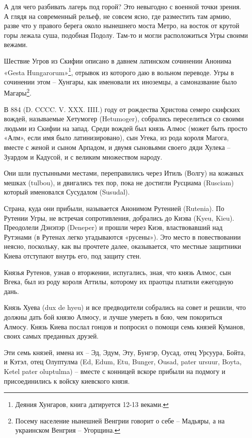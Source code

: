 А для чего разбивать лагерь под горой? Это невыгодно с военной точки зрения. А глядя на современный рельеф, не совсем ясно, где разместить там армию, разве что у правого берега около нынешнего моста Метро, на восток от крутой горы лежала суша, подобная Подолу. Там-то и могли расположиться Угры своими вежами.

Шествие Угров из Скифии описано в давнем латинском сочинении Анонима «Gesta Hungarorum»\footnote{Деяния Хунгаров, книга датируется 12-13 веками.}, отрывок из которого даю в вольном переводе. Угры в сочинении этом – Хунгары, как именовали их иноземцы, а самоназвание было Магары\footnote{Посему население нынешней Венгрии говорит о себе – Мадьяры, а на украинском Венгрия – Угорщина.}.

В 884 (D. CCCC. V. XXX. IIII.) году от рождества Христова семеро скифских вождей, называемые Хетумогер (Hetumoger), собрались переселиться со своими людьми из Скифии на запад. Среди вождей был князь Алмос (может быть просто «Алм», если имя было латинизировано), сын Угека, из рода короля Магога, вместе с женой и сыном Арпадом, и двумя сыновьями своего дяди Хулека – Зуардом и Кадусой, и с великим множеством народу.

Они шли пустынными местами, переправились через Итиль (Волгу) на кожаных мешках (tulbou), и двигались тех пор, пока не достигли Русциама (Rusciam) который именовался Сусудалом (Susudal).

Страна, куда они прибыли, называется Анонимом Рутенией (Rutenia). По Рутении Угры, не встречая сопротивления, добрались до Киэва (Kyeu, Kieu). Преодолели Дэнэпэр (Deneper) и прошли через Киэв, властвовавший над Рутэнами (в Рутенах легко угадываются «русены»). Это место в повествовании неясно, поскольку, как вы прочтете далее, оказывается, что местные защитники Киева отступают внутрь его, под защиту стен.

Князья Рутенов, узнав о вторжении, испугались, зная, что князь Алмос, сын Вгека, был из роду короля Аттилы, которому их праотцы платили ежегодную дань.

Князь Хуева (dux de hyeu) и все предводители собрались на совет и решили, что должны дать бой князю Алмосу, и лучше умереть в бою, чем покориться Алмосу. Князь Киева послал гонцов и попросил о помощи семь князей Куманов, своих самых преданных друзей.

Эти семь князей, имена их – Эд, Эдум, Эту, Бунгэр, Оусад, отец Урсуура, Бойта, и Кэтэл, отец Олуптулма (Ed, Edum, Etu, Bunger, Ousad, pater ursuur, Boyta, Ketel pater oluptulma) – вместе с конницей вскоре прибыли на подмогу и присоединились к войску киевского князя.

